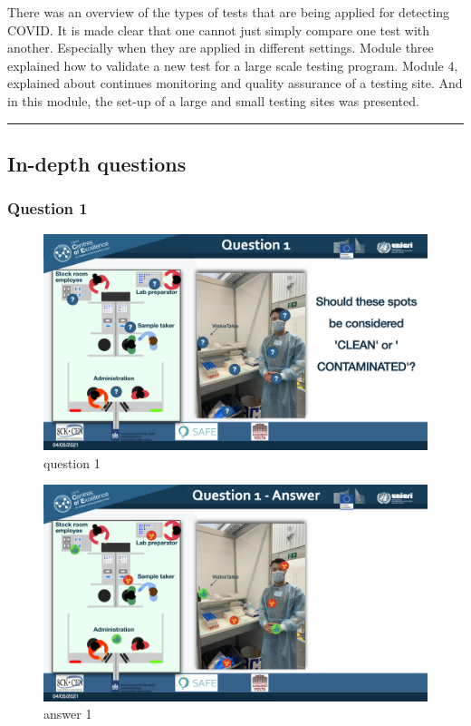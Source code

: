 \documentclass[
]{book}
\begin{document}
There was an overview of the types of tests that are being applied for
detecting COVID. It is made clear that one cannot just simply compare
one test with another. Especially when they are applied in different
settings. Module three explained how to validate a new test for a large
scale testing program. Module 4, explained about continues monitoring
and quality assurance of a testing site. And in this module, the set-up
of a large and small testing sites was presented.

\begin{center}\rule{0.5\linewidth}{0.5pt}\end{center}

\hypertarget{in-depth-questions-3}{%
\subsection{In-depth questions}\label{in-depth-questions-3}}

\hypertarget{question-1-3}{%
\subsubsection{Question 1}\label{question-1-3}}

\begin{figure}
\centering
\includegraphics{images/m05/m05_questions_v2.001.jpeg}
\caption{question 1}
\end{figure}

\begin{figure}
\centering
\includegraphics{images/m05/m05_questions_v2.002.jpeg}
\caption{answer 1}
\end{figure}
\end{document}
